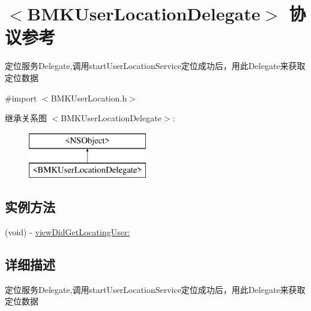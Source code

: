 \hypertarget{protocol_b_m_k_user_location_delegate-p}{\section{$<$B\-M\-K\-User\-Location\-Delegate$>$ 协议参考}
\label{protocol_b_m_k_user_location_delegate-p}
}


定位服务\-Delegate,调用start\-User\-Location\-Service定位成功后，用此\-Delegate来获取定位数据  




{\ttfamily \#import $<$B\-M\-K\-User\-Location.\-h$>$}

继承关系图 $<$B\-M\-K\-User\-Location\-Delegate$>$\-:\begin{figure}[H]
\begin{center}
\leavevmode
\includegraphics[height=2.000000cm]{protocol_b_m_k_user_location_delegate-p}
\end{center}
\end{figure}
\subsection*{实例方法}
\begin{DoxyCompactItemize}
\item 
(void) -\/ \hyperlink{protocol_b_m_k_user_location_delegate-p_a6eb799459f7a93da48fddd28bb5512f7}{view\-Did\-Get\-Locating\-User\-:}
\end{DoxyCompactItemize}


\subsection{详细描述}
定位服务\-Delegate,调用start\-User\-Location\-Service定位成功后，用此\-Delegate来获取定位数据 

